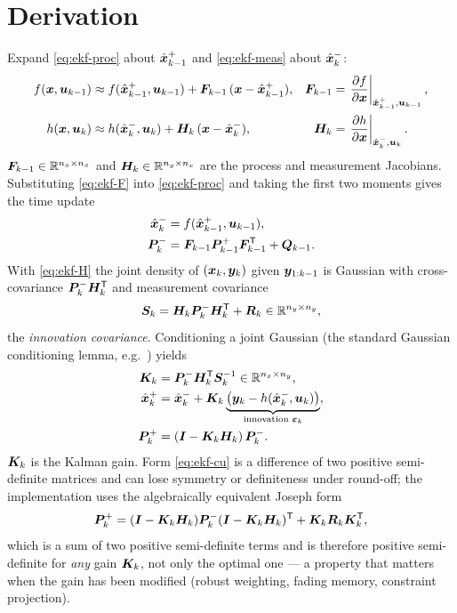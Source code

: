 \section{Derivation}
Expand \eqref{eq:ekf-proc} about $\hat{\bm{x}}^{+}_{k-1}$ and \eqref{eq:ekf-meas} about $\hat{\bm{x}}^{-}_k$:
\begin{align}
f(\bm{x},\bm{u}_{k-1}) &\approx f(\hat{\bm{x}}^{+}_{k-1},\bm{u}_{k-1}) + \bm{F}_{k-1}\,(\bm{x} - \hat{\bm{x}}^{+}_{k-1}),
 & \bm{F}_{k-1} &= \left.\frac{\partial f}{\partial \bm{x}}\right|_{\hat{\bm{x}}^{+}_{k-1},\bm{u}_{k-1}}, \label{eq:ekf-F}\\
h(\bm{x},\bm{u}_k) &\approx h(\hat{\bm{x}}^{-}_{k},\bm{u}_k) + \bm{H}_{k}\,(\bm{x} - \hat{\bm{x}}^{-}_{k}),
 & \bm{H}_{k} &= \left.\frac{\partial h}{\partial \bm{x}}\right|_{\hat{\bm{x}}^{-}_{k},\bm{u}_k}. \label{eq:ekf-H}
\end{align}
$\bm{F}_{k-1}\in\mathbb{R}^{n_x\times n_x}$ and $\bm{H}_k\in\mathbb{R}^{n_y\times n_x}$ are the process and
measurement Jacobians. Substituting \eqref{eq:ekf-F} into \eqref{eq:ekf-proc} and taking the
first two moments gives the time update
\begin{align}
\hat{\bm{x}}^{-}_k &= f(\hat{\bm{x}}^{+}_{k-1}, \bm{u}_{k-1}), \label{eq:ekf-tu-mean}\\
\bm{P}^{-}_k &= \bm{F}_{k-1}\bm{P}^{+}_{k-1}\bm{F}_{k-1}^{\mathsf{T}} + \bm{Q}_{k-1}. \label{eq:ekf-tu-cov}
\end{align}
With \eqref{eq:ekf-H} the joint density of $(\bm{x}_k,\bm{y}_k)$ given $\bm{y}_{1:k-1}$ is Gaussian
with cross-covariance $\bm{P}^{-}_k\bm{H}_k^{\mathsf{T}}$ and measurement covariance
\begin{equation}
\bm{S}_k = \bm{H}_k \bm{P}^{-}_k \bm{H}_k^{\mathsf{T}} + \bm{R}_k \in\mathbb{R}^{n_y\times n_y}, \label{eq:ekf-S}
\end{equation}
the \emph{innovation covariance}. Conditioning a joint Gaussian (the standard Gaussian
conditioning lemma, e.g.~\cite[\S A.1]{sarkka2013}) yields
\begin{align}
\bm{K}_k &= \bm{P}^{-}_k \bm{H}_k^{\mathsf{T}} \bm{S}_k^{-1} \in \mathbb{R}^{n_x\times n_y}, \label{eq:ekf-K}\\
\hat{\bm{x}}^{+}_k &= \hat{\bm{x}}^{-}_k + \bm{K}_k \underbrace{\left(\bm{y}_k - h(\hat{\bm{x}}^{-}_k,\bm{u}_k)\right)}_{\text{innovation } \bm{\varepsilon}_k},
 \label{eq:ekf-mu}\\
\bm{P}^{+}_k &= \left(\bm{I} - \bm{K}_k\bm{H}_k\right)\bm{P}^{-}_k. \label{eq:ekf-cu}
\end{align}
$\bm{K}_k$ is the Kalman gain. Form \eqref{eq:ekf-cu} is a difference of two positive
semi-definite matrices and can lose symmetry or definiteness under round-off; the
implementation uses the algebraically equivalent Joseph form~\cite{bucyjoseph1968}
\begin{equation}
\bm{P}^{+}_k = (\bm{I}-\bm{K}_k\bm{H}_k)\bm{P}^{-}_k(\bm{I}-\bm{K}_k\bm{H}_k)^{\mathsf{T}} + \bm{K}_k\bm{R}_k\bm{K}_k^{\mathsf{T}},
\label{eq:ekf-joseph}
\end{equation}
which is a sum of two positive semi-definite terms and is therefore positive semi-definite
for \emph{any} gain $\bm{K}_k$, not only the optimal one --- a property that matters when the
gain has been modified (robust weighting, fading memory, constraint projection).

